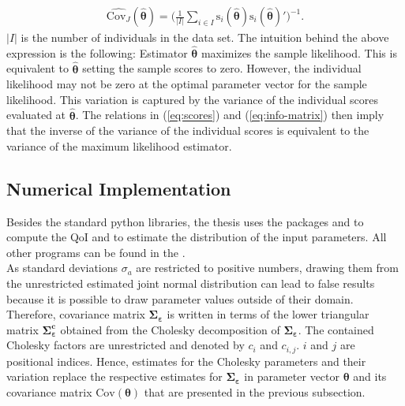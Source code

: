 \begin{align} \label{eq:est-cov}
\hat{\text{Cov}_J}(\pmb{\hat{\theta}}) = \bigg( \frac{1}{|I|} \sum_{i \in I} \text{s}_i(\pmb{\hat{\theta}})\text{s}_i(\pmb{\hat{\theta}})' \bigg)^{-1}.
\end{align}
$|I|$ is the number of individuals in the data set.
The intuition behind the above expression is the following: Estimator $\pmb{\hat{\theta}}$ maximizes the sample likelihood. This is equivalent to $\pmb{\hat{\theta}}$ setting the sample scores to zero. However, the individual likelihood may not be zero at the optimal parameter vector for the sample likelihood. This variation is captured by the variance of the individual scores evaluated at $\pmb{\hat{\theta}}$. The relations in (\ref{eq:scores}) and (\ref{eq:info-matrix}) then imply that the inverse of the variance of the individual scores is equivalent to the variance of the maximum likelihood estimator.
\subsection{Numerical Implementation}

Besides the standard python libraries, the thesis uses the packages  and  to compute the QoI and to estimate the distribution of the input parameters. All other programs can be found in the  .\\

\noindent
As standard deviations $\sigma_{a}$ are restricted to positive numbers, drawing them from the unrestricted estimated joint normal distribution can lead to false results because it is possible to draw parameter values outside of their domain. Therefore, covariance matrix $\pmb{\Sigma_\varepsilon}$ is written in terms of the lower triangular matrix $\pmb{\Sigma_\varepsilon^c}$ obtained from the Cholesky decomposition of $\pmb{\Sigma_\varepsilon}$. The contained Cholesky factors are unrestricted and denoted by $c_{i}$ and $c_{i,j}$. $i$ and $j$ are positional indices. Hence, estimates for the Cholesky parameters and their variation replace the respective estimates for $\pmb{\Sigma_\varepsilon}$ in parameter vector $\pmb{\theta}$ and its covariance matrix $\text{Cov}(\pmb{\theta})$ that are presented in the previous subsection.

